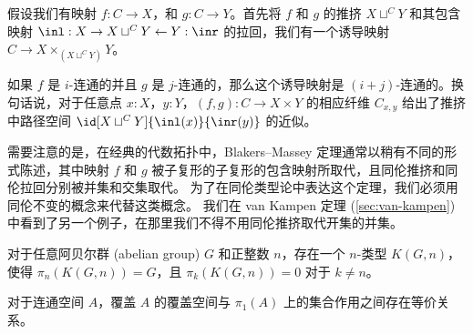 {%
%

\begin{thm}\label{Blakers-Massey}
%
%
假设我们有映射 $f : C  \rightarrow X$，和 $g : C \rightarrow Y$。首先将 $f$ 和 $g$ 的推挤 $X \sqcup^C Y $ 和其包含映射 $\inl : X \rightarrow X \sqcup^C Y \leftarrow Y : \inr$ 的拉回，我们有一个诱导映射 $C \to X \times_{(X \sqcup^C Y)} Y$。

如果 $f$ 是 $i$-连通的并且 $g$ 是 $j$-连通的，那么这个诱导映射是 $(i+j)$-连通的。换句话说，对于任意点 $x:X$，$y:Y$，$(f,g) : C \to X \times Y $ 的相应纤维 $C_{x,y}$ 给出了推挤中路径空间 $\id[X \sqcup^C Y]{\inl(x)}{\inr(y)}$ 的近似。
\end{thm}

需要注意的是，在经典的代数拓扑中，Blakers--Massey 定理通常以稍有不同的形式陈述，其中映射 $f$ 和 $g$ 被子复形的子复形的包含映射所取代，且同伦推挤和同伦拉回分别被并集和交集取代。
为了在同伦类型论中表达这个定理，我们必须用同伦不变的概念来代替这类概念。
我们在 van Kampen 定理 (\cref{sec:van-kampen}) 中看到了另一个例子，在那里我们不得不用同伦推挤取代开集的并集。

\begin{thm}\label{Eilenberg-Mac-Lane-Spaces}
对于任意阿贝尔群 (abelian group) $G$ 和正整数 $n$，存在一个 $n$-类型
$K(G,n)$，使得 $\pi_n(K(G,n)) = G$，且  $\pi_k(K(G,n)) = 0$
对于 $k\neq n$。
\end{thm}

\begin{thm}\label{thm:covering-spaces}
%
对于连通空间 $A$，覆盖 $A$ 的覆盖空间与 $\pi_1(A)$ 上的集合作用之间存在等价关系。
\end{thm}


\sectionNotes


}

